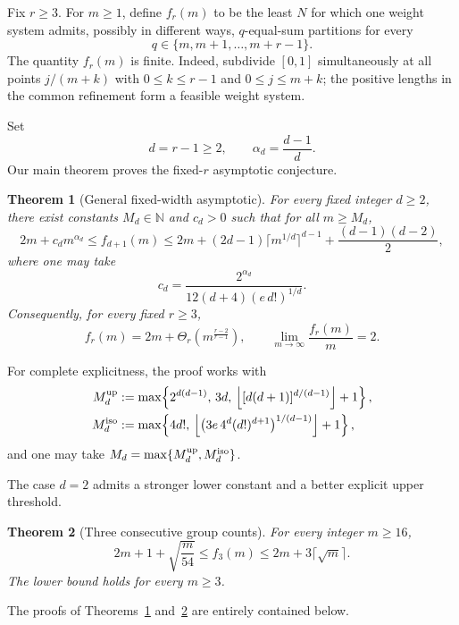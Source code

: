 \documentclass[11pt]{article}
\newtheorem{theorem}{Theorem}[section]
\theoremstyle{definition}
\newcommand{\N}{\mathbb{N}}
\newcommand{\1}{\mathbf{1}}
\begin{document}
Fix $r\ge3$.  For $m\ge1$, define $f_r(m)$ to be the least $N$ for which one weight system admits, possibly in different ways, $q$-equal-sum partitions for every
\[
  q\in\{m,m+1,\ldots,m+r-1\}.
\]
The quantity $f_r(m)$ is finite.  Indeed, subdivide $[0,1]$ simultaneously at all points $j/(m+k)$ with $0\le k\le r-1$ and $0\le j\le m+k$; the positive lengths in the common refinement form a feasible weight system.

Set
\[
  d=r-1\ge2,\qquad \alpha_d=\frac{d-1}{d}.
\]
Our main theorem proves the fixed-$r$ asymptotic conjecture.

\begin{theorem}[General fixed-width asymptotic]\label{thm:main}
For every fixed integer $d\ge2$, there exist constants $M_d\in\N$ and $c_d>0$ such that for all $m\ge M_d$,
\begin{equation}\label{eq:main-precise}
  2m+c_d m^{\alpha_d}
  \le f_{d+1}(m)
  \le 2m+(2d-1)\lceil m^{1/d}\rceil^{d-1}
       +\frac{(d-1)(d-2)}2,
\end{equation}
where one may take
\begin{equation}\label{eq:cd}
  c_d=\frac{2^{\alpha_d}}
  {12(d+4)(e\,d!)^{1/d}}.
\end{equation}
Consequently, for every fixed $r\ge3$,
\[
  f_r(m)=2m+\Theta_r\!\left(m^{\frac{r-2}{r-1}}\right),
  \qquad
  \lim_{m\to\infty}\frac{f_r(m)}m=2.
\]
\end{theorem}

For complete explicitness, the proof works with
\begin{align}
 M_d^{\rm up}
 &:=\max\!\left\{
      2^{d(d-1)},\,3d,\,
      \left\lfloor[d(d+1)]^{d/(d-1)}\right\rfloor+1
     \right\},\label{eq:Mup}\\
 M_d^{\rm iso}
 &:=\max\!\left\{
      4d!,\,
      \left\lfloor
      \bigl(3e\,4^d(d!)^{d+1}\bigr)^{1/(d-1)}
      \right\rfloor+1
     \right\},\label{eq:Miso}
\end{align}
and one may take $M_d=\max\{M_d^{\rm up},M_d^{\rm iso}\}$.

The case $d=2$ admits a stronger lower constant and a better explicit upper threshold.

\begin{theorem}[Three consecutive group counts]\label{thm:three}
For every integer $m\ge16$,
\[
  2m+1+\sqrt{\frac{m}{54}}
  \le f_3(m)
  \le 2m+3\lceil\sqrt m\rceil.
\]
The lower bound holds for every $m\ge3$.
\end{theorem}

The proofs of Theorems~\ref{thm:main} and~\ref{thm:three} are entirely contained below.
\end{document}
